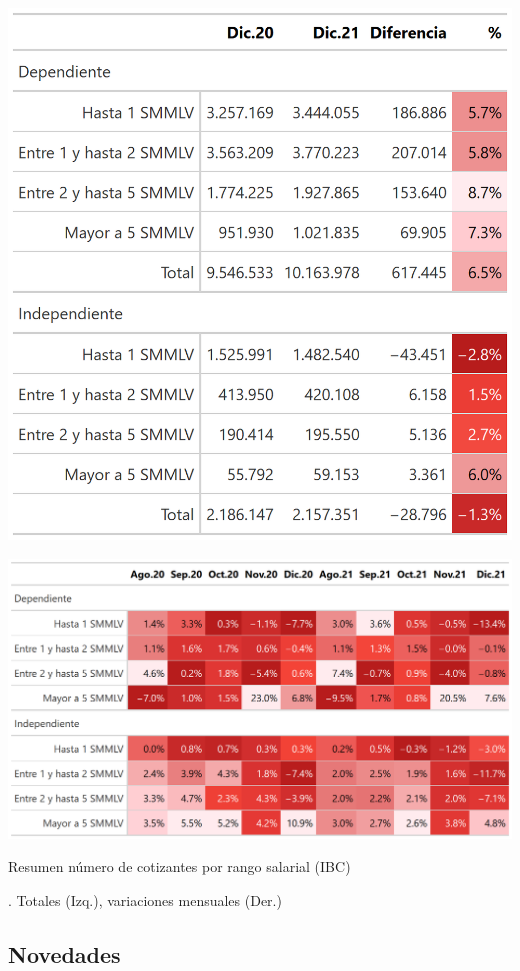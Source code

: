\begin{table}[!h]
\centering
\begin{minipage}{0.5\textwidth}
  \centering
  \includegraphics[width=0.6\linewidth]{results/Resumen/salida_table3_total.png}
\end{minipage}%
\begin{minipage}{0.5\textwidth}
  \centering
  \includegraphics[width=\linewidth]{results/Resumen/salida_table3_variaciones.png}
\end{minipage}
\caption{Resumen número de cotizantes por rango salarial (IBC)}. Totales (Izq.), variaciones mensuales (Der.)
\label{tabla:tabla3}
\end{table}


\subsection{Novedades}


